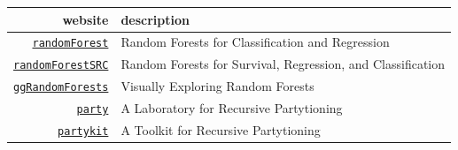 \documentclass[]{book}
\theoremstyle{definition}
\theoremstyle{definition}
\theoremstyle{definition}
\theoremstyle{remark}
\begin{document}
\begin{longtable}[]{@{}rl@{}}
\toprule
\begin{minipage}[b]{0.18\columnwidth}\raggedleft\strut
website\strut
\end{minipage} & \begin{minipage}[b]{0.18\columnwidth}\raggedright\strut
description\strut
\end{minipage}\tabularnewline
\midrule
\endhead
\begin{minipage}[t]{0.18\columnwidth}\raggedleft\strut
\href{https://www.guru99.com/r-random-forest-tutorial.html}{\texttt{randomForest}}\strut
\end{minipage} & \begin{minipage}[t]{0.18\columnwidth}\raggedright\strut
Random Forests for Classification and Regression\strut
\end{minipage}\tabularnewline
\begin{minipage}[t]{0.18\columnwidth}\raggedleft\strut
\href{http://www.riptutorial.com/r/example/13086/random-forest-survival-analysis-with-randomforestsrc}{\texttt{randomForestSRC}}\strut
\end{minipage} & \begin{minipage}[t]{0.18\columnwidth}\raggedright\strut
Random Forests for Survival, Regression, and Classification\strut
\end{minipage}\tabularnewline
\begin{minipage}[t]{0.18\columnwidth}\raggedleft\strut
\href{https://arxiv.org/pdf/1612.08974.pdf}{\texttt{ggRandomForests}}\strut
\end{minipage} & \begin{minipage}[t]{0.18\columnwidth}\raggedright\strut
Visually Exploring Random Forests\strut
\end{minipage}\tabularnewline
\begin{minipage}[t]{0.18\columnwidth}\raggedleft\strut
\href{http://party.r-forge.r-project.org/}{\texttt{party}}\strut
\end{minipage} & \begin{minipage}[t]{0.18\columnwidth}\raggedright\strut
A Laboratory for Recursive Partytioning\strut
\end{minipage}\tabularnewline
\begin{minipage}[t]{0.18\columnwidth}\raggedleft\strut
\href{}{\texttt{partykit}}\strut
\end{minipage} & \begin{minipage}[t]{0.18\columnwidth}\raggedright\strut
A Toolkit for Recursive Partytioning\strut
\end{minipage}\tabularnewline
\bottomrule
\end{longtable}
\end{document}
